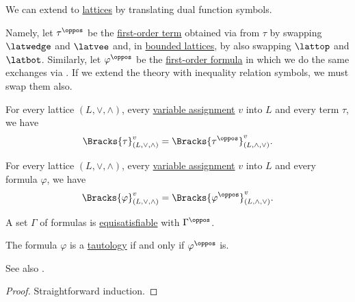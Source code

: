 \begin{theorem}\label{thm:lattice_duality}
  We can extend  to \hyperref[def:lattice]{lattices} by translating dual function symbols.

  Namely, let \( \tau^\oppos \) be the \hyperref[def:fol_term]{first-order term} obtained via  from \( \tau \) by swapping \( \latwedge \) and \( \latvee \) and, in \hyperref[def:bounded_lattice]{bounded lattices}, by also swapping \( \lattop \) and \( \latbot \). Similarly, let \( \varphi^\oppos \) be the \hyperref[def:fol_formula]{first-order formula} in which we do the same exchanges via . If we extend the theory with inequality relation symbols, we must swap them also.

  \begin{thmenum}
     For every lattice \( (L, \vee, \wedge) \), every \hyperref[def:fol_variable_assignment]{variable assignment} \( v \) into \( L \) and every term \( \tau \), we have
    \begin{equation*}
      \Bracks{\tau}_{(L, \vee, \wedge)}^v = \Bracks{\tau^\oppos}_{(L, \wedge, \vee)}^v.
    \end{equation*}

     For every lattice \( (L, \vee, \wedge) \), every \hyperref[def:fol_variable_assignment]{variable assignment} \( v \) into \( L \) and every formula \( \varphi \), we have
    \begin{equation*}
      \Bracks{\varphi}_{(L, \vee, \wedge)}^v = \Bracks{\varphi^\oppos}_{(L, \wedge, \vee)}^v.
    \end{equation*}

     A set \( \Gamma \) of formulas is \hyperref[def:equisatisfiability]{equisatisfiable} with \( \Gamma^\oppos \).

     The formula \( \varphi \) is a \hyperref[def:fol_semantics/tautology]{tautology} if and only if \( \varphi^\oppos \) is.
  \end{thmenum}
\end{theorem}
\begin{comments}
  \item See also .
\end{comments}
\begin{proof}
  Straightforward induction.
\end{proof}

